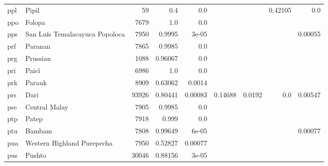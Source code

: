 \documentclass[11pt]{article}
\begin{document}
\begin{table*}[h]
{\begin{tabular}{llrrrrrrr}
ppl         & Pipil         & 59         & 0.4         & 0.0         &          &          & 0.42105         & 0.0         \\

ppo         & Folopa         & 7679         & 1.0         & 0.0         &          &          &          &          \\

pps         & San Luís Temalacayuca Popoloca         & 7950         & 0.9995         & 3e-05         &          &          &          & 0.00055         \\

prf         & Paranan         & 7865         & 0.9985         & 0.0         &          &          &          &          \\

prg         & Prussian         & 1088         & 0.96067         & 0.0         &          &          &          &          \\

pri         & Paicî         & 6986         & 1.0         & 0.0         &          &          &          &          \\

prk         & Parauk         & 8909         & 0.63062         & 0.0014         &          &          &          &          \\

prs         & Dari         & 93926         & 0.80441         & 0.00083         & 0.14688         & 0.0192         & 0.0         & 0.00547         \\

pse         & Central Malay         & 7905         & 0.9985         & 0.0         &          &          &          &          \\

ptp         & Patep         & 7918         & 0.999         & 0.0         &          &          &          &          \\

ptu         & Bambam         & 7808         & 0.99649         & 6e-05         &          &          &          & 0.00077         \\

pua         & Western Highland Purepecha         & 7950         & 0.52827         & 0.00077         &          &          &          &          \\

pus         & Pushto         & 30046         & 0.88156         & 3e-05         &          &          &          &          \\


\end{tabular}}
\end{table*}
\end{document}
